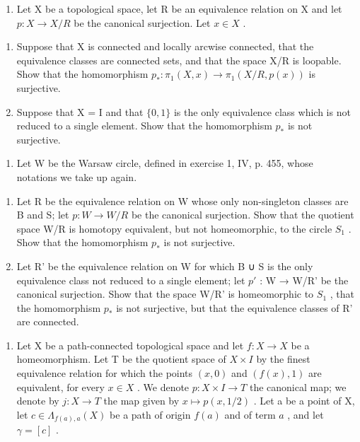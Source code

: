 \begin{enumerate}
\def\labelenumi{\arabic{enumi})}
\setcounter{enumi}{8}
\tightlist
\item
  Let X be a topological space, let R be an equivalence relation on X and let \(p: X \to X/R\) be the canonical surjection. Let \(x \in X\) .
\end{enumerate}

\begin{enumerate}
\def\labelenumi{\alph{enumi})}
\item
  Suppose that X is connected and locally arcwise connected, that the equivalence classes are connected sets, and that the space X/R is loopable. Show that the homomorphism \(p_{*}:\pi_{1}(X,x)\to\pi_{1}(X/R,p(x))\) is surjective.
\item
  Suppose that X = I and that \(\{0,1\}\) is the only equivalence class which is not reduced to a single element. Show that the homomorphism \(p_{*}\) is not surjective.
\end{enumerate}

\begin{enumerate}
\def\labelenumi{\arabic{enumi})}
\setcounter{enumi}{9}
\tightlist
\item
  Let W be the Warsaw circle, defined in exercise 1, IV, p. 455, whose notations we take up again.
\end{enumerate}

\begin{enumerate}
\def\labelenumi{\alph{enumi})}
\item
  Let R be the equivalence relation on W whose only non-singleton classes are B and S; let \(p: W \rightarrow W/R\) be the canonical surjection. Show that the quotient space W/R is homotopy equivalent, but not homeomorphic, to the circle \(S_{1}\) . Show that the homomorphism \(p_{*}\) is not surjective.
\item
  Let R' be the equivalence relation on W for which B ∪ S is the only equivalence class not reduced to a single element; let \(p'\) : W → W/R' be the canonical surjection. Show that the space W/R' is homeomorphic to \(S_{1}\) , that the homomorphism \(p_{*}\) is not surjective, but that the equivalence classes of R' are connected.
\end{enumerate}

\begin{enumerate}
\def\labelenumi{\arabic{enumi})}
\setcounter{enumi}{10}
\tightlist
\item
  Let X be a path-connected topological space and let \(f: X \to X\) be a homeomorphism. Let T be the quotient space of \(X \times I\) by the finest equivalence relation for which the points \((x,0)\) and \((f(x),1)\) are equivalent, for every \(x \in X\) . We denote \(p: X \times I \to T\) the canonical map; we denote by \(j\colon X\to T\) the map given by \(x\mapsto p(x,1/2)\) . Let a be a point of X, let \(c\in\Lambda_{f(a),a}(X)\) be a path of origin \(f(a)\) and of term \(a\) , and let \(\gamma=[c]\) .
\end{enumerate}

